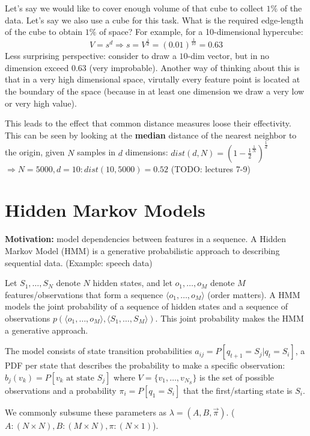 \documentclass[a4paper]{article}
\begin{document}
Let's say we would like to cover enough volume of that cube to collect $1\%$ of the data. Let's say we also use a cube for this task. What is the required edge-length of the cube to obtain $1\%$ of space? For example, for a 10-dimensional hypercube:
\[V = s^d \Rightarrow s = V^{\frac{1}{d}} = (0.01)^{\frac{1}{10}} = 0.63\]
Less surprising perspective: consider to draw a $10$-dim vector, but in no dimension exceed $0.63$ (very improbable).
Another way of thinking about this is that in a very high dimensional space, virutally every feature point is located at the boundary of the space (because in at least one dimension we draw a very low or very high value).

This leads to the effect that common distance measures loose their effectivity. This can be seen by looking at the \textbf{median} distance of the nearest neighbor to the origin, given $N$ samples in $d$ dimensions: $dist(d, N) = (1 - \frac{1}{2}^{\frac{1}{N}})^{\frac{1}{d}}$\\
$\Rightarrow N=5000, d=10: dist(10, 5000) = 0.52$
(TODO: lectures 7-9)

\section{Hidden Markov Models}
\textbf{Motivation:} model dependencies between features in a sequence. A Hidden Markov Model (HMM) is a generative probabilistic approach to describing sequential data. (Example: speech data)

Let \(S_1, \dots, S_{N}\) denote $N$ hidden states, and let \(o_1, \dots, o_M\) denote \(M\) features/observations that form a sequence \(\langle o_1, \dots, o_M \rangle\) (order matters). A HMM models the joint probability of a sequence of hidden states and a sequence of observations \(p(\langle o_1, \dots, o_M \rangle, \langle S_1, \dots, S_M \rangle)\). This joint probability makes the HMM a generative approach.

The model consists of state transition probabilities \(a_{ij} = P[q_{t+1} = S_j | q_t = S_i]\), a PDF per state that describes the probability to make a specific observation: \( b_j (v_k) = P[ v_k \text{ at state } S_j]\) where $V = \{v_1, \dots, v_{N_S}\}$ is the set of possible observations and a probability \(\pi_i = P[ q_1 = S_i] \) that the first/starting state is \(S_i\).

We commonly subsume these parameters as \(\lambda = (A, B, \vec{\pi}) \). (\( A: (N \times N), B: (M \times N), \pi: (N \times 1)\)).
\end{document}
